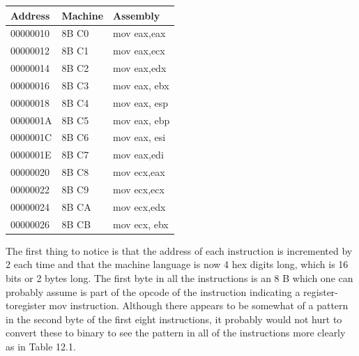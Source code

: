 \documentclass[10pt]{book}
\begin{document}
\begin{center}
\begin{tabular}{|l|l|l|}
\hline
Address & Machine & Assembly \\
\hline
00000010 & 8B C0 & mov eax,eax \\
\hline
00000012 & 8B C1 & mov eax,ecx \\
\hline
00000014 & 8B C2 & mov eax,edx \\
\hline
00000016 & 8B C3 & mov eax, ebx \\
\hline
00000018 & 8B C4 & mov eax, esp \\
\hline
0000001A & 8B C5 & mov eax, ebp \\
\hline
0000001C & 8B C6 & mov eax, esi \\
\hline
0000001E & 8B C7 & mov eax,edi \\
\hline
00000020 & 8B C8 & mov ecx,eax \\
\hline
00000022 & 8B C9 & mov ecx,ecx \\
\hline
00000024 & 8B CA & mov ecx,edx \\
\hline
00000026 & 8B CB & mov ecx, ebx \\
\hline
\end{tabular}
\end{center}

The first thing to notice is that the address of each instruction is incremented by 2 each time and that the machine language is now 4 hex digits long, which is 16 bits or 2 bytes long. The first byte in all the instructions is an 8 B which one can probably assume is part of the opcode of the instruction indicating a register-toregister mov instruction. Although there appears to be somewhat of a pattern in the second byte of the first eight instructions, it probably would not hurt to convert these to binary to see the pattern in all of the instructions more clearly as in Table 12.1.
\end{document}

